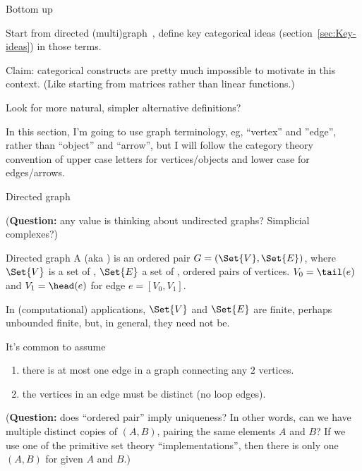 \begin{plSection}{Bottom up}
\label{sec:Bottom-up}

Start from directed (multi)graph~\cite{wiki:DirectedGraph},
define key categorical ideas (section~\ref{sec:Key-ideas}) 
in those terms.

Claim: categorical constructs are 
pretty much impossible to motivate in this context.
(Like starting from matrices rather than linear functions.)

Look for more natural, simpler alternative definitions?

In this section, I'm going to use graph terminology,
eg, ``vertex'' and ''edge'', rather than ``object'' and ``arrow'',
but I will follow the category theory convention of
upper case letters for vertices/objects and lower case for
edges/arrows.

\begin{plSection}{Directed graph}
\label{sec:Directed_graph}

(\textbf{Question:}
 any value is thinking about undirected graphs?
 Simplicial complexes?)

\begin{plDefinition}{Directed graph}{}
A  (aka ) is
an ordered pair $G=\left( \Set{V}, \Set{E} \right)$,
where $\Set{V}$ is a set of , 
$\Set{E}$ a set of , ordered pairs of vertices.
$V_0 = \tail(e)$ and $V_1 = \head(e)$
for edge $e = \left[ V_0, V_1 \right]$.
\end{plDefinition}

In (computational) applications, $\Set{V}$ and $\Set{E}$ 
are finite, perhaps unbounded finite,
but, in general, they need not be.

It's common to assume 
\begin{enumerate}
\item there is at most one edge
in a graph connecting any $2$ vertices.\par
\item the vertices in an edge must be 
distinct (no loop edges).
\end{enumerate}
(\textbf{Question:} does ``ordered pair'' imply uniqueness?
In other words, can we have multiple distinct copies of
 $\left(A,B\right)$, pairing the same elements $A$ and $B$?
 If we use one of the primitive set theory ``implementations'',
 then there is only one $\left(A,B\right)$ 
 for given $A$ and $B$.)


\end{plSection}
\end{plSection}
